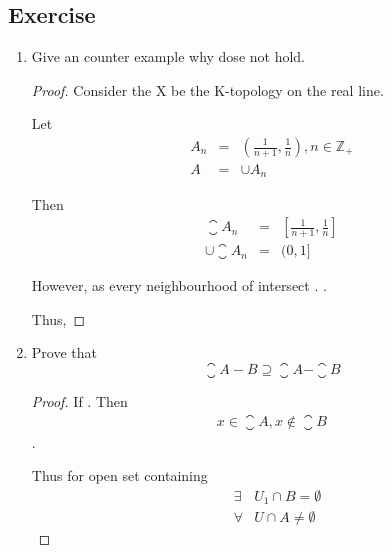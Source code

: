 \subsection{Exercise}

\begin{enumerate}
      \item Give an counter example why  dose not hold.

      \begin{proof}
            Consider the X be the K-topology on the real line.
      
            Let
            \begin{eqnarray*}
                  A_{n} &=& (\frac{1}{n+1},\frac{1}{n}), n \in \mathbb{Z}_{+} \\
                  A &=& \cup A_{n}
            \end{eqnarray*}
      
            Then 
            \begin{eqnarray*}
                  \closure{A_{n}} &=& [\frac{1}{n+1},\frac{1}{n}] \\
                  \cup \closure{A_{n}} &=& (0,1]
            \end{eqnarray*}
      
            However, as every neighbourhood of  intersect . .
      
            Thus, 
      \end{proof}

      \item Prove that 
      \begin{equation*}
            \closure{A-B} \supseteq \closure{A} - \closure{B}
      \end{equation*}

      \begin{proof}
            If . Then
            \begin{eqnarray*}
                  x \in \closure{A}, x \notin \closure{B}
            \end{eqnarray*}.

            Thus for open set  containing 
            \begin{eqnarray*}
                  &\exists& U_{1} \cap B = \emptyset \\
                  &\forall& U \cap A \neq \emptyset
            \end{eqnarray*}


\end{proof}
\end{enumerate}

